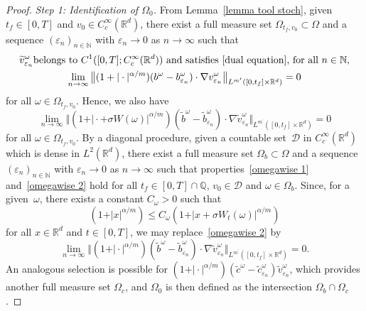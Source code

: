\documentclass[a4paper,10pt]{article}
\newcommand\1{\mathbbm{1}}
\newcommand{\eps}{\varepsilon}
\numberwithin{equation}{section}
\begin{document}
\begin{proof}
\emph{Step 1: Identification of $\Omega_{0}$.} From Lemma~\ref{lemma tool stoch}, given $t_{f}\in [0,T]$ and $v_{0}\in C_{c}^{\infty}(\mathbb{R}^{d})$, there exist a full measure set $\Omega_{t_{f},v_{0}} \subset\Omega$ and a sequence $(\eps_{n})_{n \in \mathbb{N}}$ with $\eps_n \to 0$ as $n \to \infty$ such that 
\begin{gather}
\widetilde{v}_{\eps_{n}}^\omega \text{belongs to $C^{1}([0,T];C_{c}^{\infty}(\mathbb{R}^{d}))$ and satisfies~\eqref{dual equation}, for all } n \in \mathbb{N},  \label{omegawise 1} \\
\lim_{n \to \infty} \big\Vert (1+\vert \cdot \vert^{\alpha/m}) (b^\omega -b_{\eps_{n}}^\omega ) \cdot \nabla v_{\eps_{n}}^\omega
\big\Vert _{L^{m^{\prime}}([0,t_{f}] \times \mathbb{R}^{d})  }=0 \nonumber
\end{gather}
for all $\omega\in\Omega_{t_{f},v_{0}}$. Hence, we also have
\begin{equation}
\lim_{n\rightarrow\infty} \big\Vert ( 1+ \vert \cdot+\sigma W(\omega) \vert^{\alpha/m}) (\widetilde{b}^\omega  -\widetilde{b}_{\eps_{n}}^\omega ) \cdot\nabla\widetilde{v}_{\eps_{n}}^\omega  \big\Vert_{L^{m^{\prime}}([0,t_{f}] \times \mathbb{R}^{d})}=0\label{omegawise 2} 
\end{equation}
for all $\omega\in\Omega_{t_{f},v_{0}}$. 
By a diagonal procedure, given a
countable set~$\mathcal{D}$ in $C_{c}^{\infty}(\mathbb{R}^{d})$ which is dense in $L^{2}(\mathbb{R}^{d})$, there exist a full measure set $\Omega_{b}\subset\Omega$ and a sequence $(\eps_{n})_{n \in \mathbb{N}}$ with $\eps_n \to 0$ as $n \to \infty$ such that properties~\eqref{omegawise 1} and~\eqref{omegawise 2} hold for all $t_{f}\in [0,T]  \cap\mathbb{Q}$,
$v_{0}\in\mathcal{D}$ and $\omega\in\Omega_{b}$. Since, for a given~$\omega$, there exists a constant $C_\omega>0$ such that
\[
( 1+ \vert x \vert^{\alpha/m} )\leq C_{\omega} (1+ \vert x+\sigma W_{t}(\omega) \vert ^{\alpha/m} )
\]
for all $x\in\mathbb{R}^{d}$ and $t\in [0,T]  $, we may replace~\eqref{omegawise 2} by
\begin{equation}
\lim_{n\rightarrow\infty}\big\Vert ( 1+ \vert \cdot \vert
^{\alpha/m}) ( \widetilde{b}^\omega -\widetilde{b}_{\eps_{n}}^\omega)  \cdot\nabla\widetilde{v}_{\eps_{n}}^\omega \big\Vert _{L^{m^{\prime}}(
[0,t_{f}] \times \mathbb{R}^{d}) } = 0\label{omegawise 2 bis} .
\end{equation}
An analogous selection is possible for $( 1+ \vert \cdot \vert^{\alpha/m}) ( \widetilde{c}^\omega -\widetilde{c}_{\eps_{n}}^\omega ) \widetilde{v}_{\eps_{n}}^\omega$, which provides another full measure set $\Omega_c$, and $\Omega_0$ is then defined as the intersection $\Omega_b \cap \Omega_c$.


\end{proof}
\end{document}
